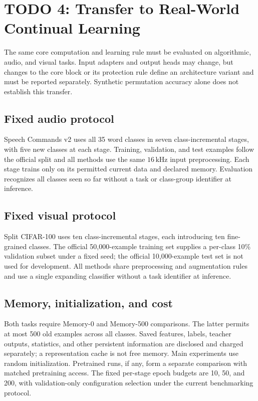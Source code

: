 \section{TODO 4: Transfer to Real-World Continual Learning}
\label{sec:real-world-transfer}

The same core computation and learning rule must be evaluated on algorithmic,
audio, and visual tasks. Input adapters and output heads may change, but changes
to the core block or its protection rule define an architecture variant and must
be reported separately. Synthetic permutation accuracy alone does not establish
this transfer.

\subsection{Fixed audio protocol}
Speech Commands v2 uses all 35 word classes in seven class-incremental stages,
with five new classes at each stage. Training, validation, and test examples
follow the official split and all methods use the same $16\,\mathrm{kHz}$ input
preprocessing. Each stage trains only on its permitted current data and declared
memory. Evaluation recognizes all classes seen so far without a task or class-group
identifier at inference.

\subsection{Fixed visual protocol}
Split CIFAR-100 uses ten class-incremental stages, each introducing ten fine-grained
classes. The official 50,000-example training set supplies a per-class 10\%
validation subset under a fixed seed; the official 10,000-example test set is not
used for development. All methods share preprocessing and augmentation rules and
use a single expanding classifier without a task identifier at inference.

\subsection{Memory, initialization, and cost}
Both tasks require Memory-0 and Memory-500 comparisons. The latter permits at most
500 old examples across all classes. Saved features, labels, teacher outputs,
statistics, and other persistent information are disclosed and charged separately;
a representation cache is not free memory. Main experiments use random
initialization. Pretrained runs, if any, form a separate comparison with matched
pretraining access. The fixed per-stage epoch budgets are 10, 50, and 200, with
validation-only configuration selection under the current benchmarking protocol.

